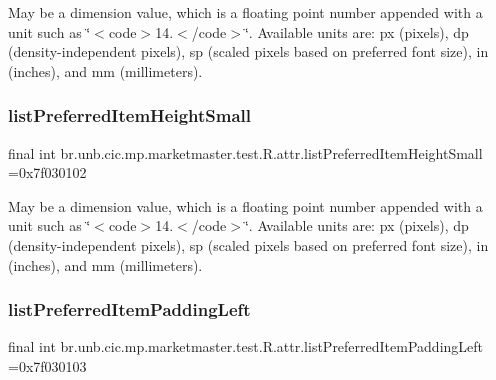 May be a dimension value, which is a floating point number appended with a unit such as \char`\"{}$<$code$>$14.\+5sp$<$/code$>$\char`\"{}. Available units are\+: px (pixels), dp (density-\/independent pixels), sp (scaled pixels based on preferred font size), in (inches), and mm (millimeters). \mbox{\label{classbr_1_1unb_1_1cic_1_1mp_1_1marketmaster_1_1test_1_1R_1_1attr_aabd216062d4ef7280a73b3ddc6f1cd5f}} 
\subsubsection{\texorpdfstring{list\+Preferred\+Item\+Height\+Small}{listPreferredItemHeightSmall}}
{\footnotesize\ttfamily final int br.\+unb.\+cic.\+mp.\+marketmaster.\+test.\+R.\+attr.\+list\+Preferred\+Item\+Height\+Small =0x7f030102\hspace{0.3cm}{\ttfamily [static]}}

May be a dimension value, which is a floating point number appended with a unit such as \char`\"{}$<$code$>$14.\+5sp$<$/code$>$\char`\"{}. Available units are\+: px (pixels), dp (density-\/independent pixels), sp (scaled pixels based on preferred font size), in (inches), and mm (millimeters). \mbox{\label{classbr_1_1unb_1_1cic_1_1mp_1_1marketmaster_1_1test_1_1R_1_1attr_ae87d24a296b498e3e5c313b1d76527cb}} 
\subsubsection{\texorpdfstring{list\+Preferred\+Item\+Padding\+Left}{listPreferredItemPaddingLeft}}
{\footnotesize\ttfamily final int br.\+unb.\+cic.\+mp.\+marketmaster.\+test.\+R.\+attr.\+list\+Preferred\+Item\+Padding\+Left =0x7f030103\hspace{0.3cm}{\ttfamily [static]}}

